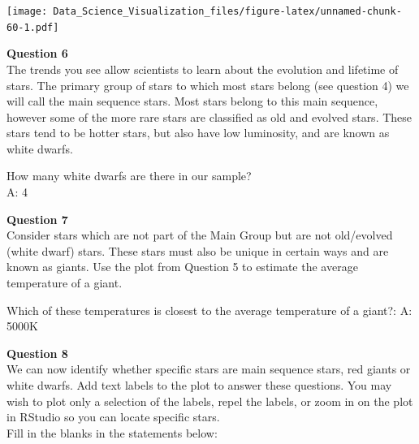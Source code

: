\documentclass[
]{article}
\newenvironment{Shaded}{\begin{snugshade}}{\end{snugshade}}
\newcommand{\DataTypeTok}[1]{\textcolor[rgb]{0.13,0.29,0.53}{#1}}
\newcommand{\KeywordTok}[1]{\textcolor[rgb]{0.13,0.29,0.53}{\textbf{#1}}}
\newcommand{\NormalTok}[1]{#1}
\newcommand{\OperatorTok}[1]{\textcolor[rgb]{0.81,0.36,0.00}{\textbf{#1}}}
\newcommand{\StringTok}[1]{\textcolor[rgb]{0.31,0.60,0.02}{#1}}
\begin{document}
\begin{Shaded}
\end{Shaded}

\texttt{[image: Data\_Science\_Visualization\_files/figure-latex/unnamed-chunk-60-1.pdf]}

\textbf{Question 6}\\
The trends you see allow scientists to learn about the evolution and
lifetime of stars. The primary group of stars to which most stars belong
(see question 4) we will call the main sequence stars. Most stars belong
to this main sequence, however some of the more rare stars are
classified as old and evolved stars. These stars tend to be hotter
stars, but also have low luminosity, and are known as white dwarfs.

How many white dwarfs are there in our sample?\\
A: 4

\textbf{Question 7}\\
Consider stars which are not part of the Main Group but are not
old/evolved (white dwarf) stars. These stars must also be unique in
certain ways and are known as giants. Use the plot from Question 5 to
estimate the average temperature of a giant.

Which of these temperatures is closest to the average temperature of a
giant?: A: 5000K

\textbf{Question 8}\\
We can now identify whether specific stars are main sequence stars, red
giants or white dwarfs. Add text labels to the plot to answer these
questions. You may wish to plot only a selection of the labels, repel
the labels, or zoom in on the plot in RStudio so you can locate specific
stars.\\
Fill in the blanks in the statements below:
\end{document}
